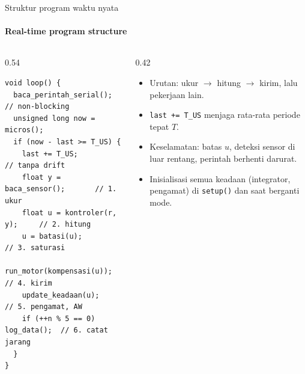 \documentclass[aspectratio=169,10pt]{beamer}
\begin{document}
\begin{frame}[fragile]{Struktur program waktu nyata}
	\framesubtitle{Real-time program structure}
	\begin{columns}[T]
		\begin{column}{0.54\textwidth}
			\begin{block}{}
				\scriptsize
\begin{verbatim}
void loop() {
  baca_perintah_serial();          // non-blocking
  unsigned long now = micros();
  if (now - last >= T_US) {
    last += T_US;                  // tanpa drift
    float y = baca_sensor();       // 1. ukur
    float u = kontroler(r, y);     // 2. hitung
    u = batasi(u);                 // 3. saturasi
    run_motor(kompensasi(u));      // 4. kirim
    update_keadaan(u);             // 5. pengamat, AW
    if (++n % 5 == 0) log_data();  // 6. catat jarang
  }
}
\end{verbatim}
			\end{block}
		\end{column}
		\begin{column}{0.42\textwidth}
			\small
			\begin{itemize}
				\item Urutan: ukur $\rightarrow$ hitung $\rightarrow$ kirim, lalu pekerjaan lain.
				\item \texttt{last += T\_US} menjaga rata-rata periode tepat $T$.
				\item Keselamatan: batas $u$, deteksi sensor di luar rentang, perintah berhenti darurat.
				\item Inisialisasi semua keadaan (integrator, pengamat) di \texttt{setup()} dan saat berganti mode.
			\end{itemize}
		\end{column}
	\end{columns}
\end{frame}
\end{document}
